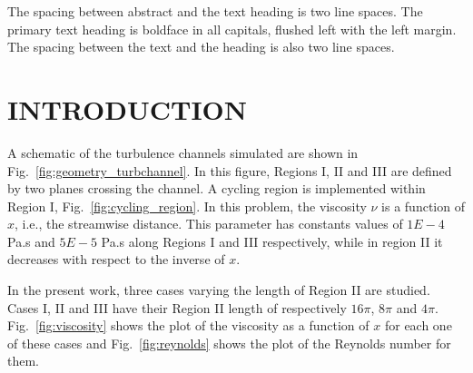 \documentclass[twocolumn,10pt]{asme2e}
\begin{document}
\begin{nomenclature}

\end{nomenclature}

The spacing between abstract and the text heading is two line spaces.  The primary text heading is  boldface in all capitals, flushed left with the left margin.  The spacing between the  text and the heading is also two line spaces.

\section*{INTRODUCTION}

A schematic of the turbulence channels simulated are shown in Fig.~\ref{fig:geometry_turbchannel}. In this figure, Regions I, II and III are defined by two planes crossing the channel. A cycling region is implemented within Region I, Fig.~\ref{fig:cycling_region}.
In this problem, the viscosity \(\nu\) is a function of \(x\), i.e., the streamwise distance. This parameter has constants values of \(1E-4\) Pa.s and \(5E-5\) Pa.s along Regions I and III respectively, while in region II it decreases with respect to the inverse of \(x\).

In the present work, three cases varying the length of Region II are studied. Cases I, II and III have their Region II length of respectively \(16\pi\), \(8\pi\) and \(4\pi\). Fig.~\ref{fig:viscosity} shows the plot of the viscosity as a function of \(x\) for each one of these cases and Fig.~\ref{fig:reynolds} shows the plot of the Reynolds number for them.
\end{document}
